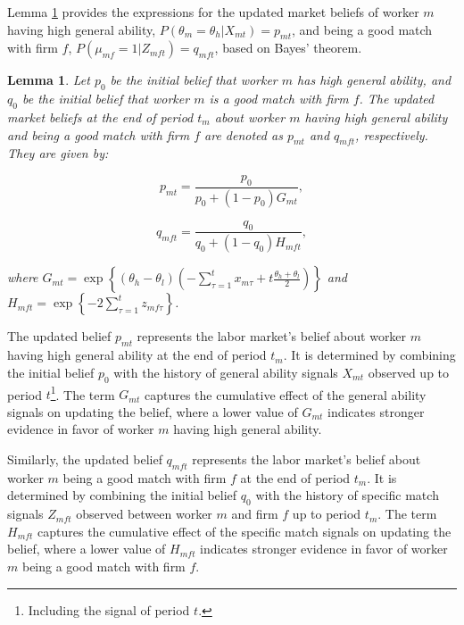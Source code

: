 \documentclass[12pt]{article}
\newtheorem{lemma}{Lemma}
\begin{document}
Lemma \ref{lemma:beliefs_NR} provides the expressions for the updated market beliefs of worker $m$ having high general ability, $P(\theta_m = \theta_h | X_{mt}) = p_{mt}$, and being a good match with firm $f$, $P(\mu_{mf} = 1 | Z_{mft}) = q_{mft}$, based on Bayes' theorem.

\begin{lemma}\label{lemma:beliefs_NR}
Let $p_0$ be the initial belief that worker $m$ has high general ability, and $q_0$ be the initial belief that worker $m$ is a good match with firm $f$. The updated market beliefs at the end of period $t_m$ about worker $m$ having high general ability and being a good match with firm $f$ are denoted as $p_{mt}$ and $q_{mft}$, respectively. They are given by:

\begin{equation}\label{eq:prob_NR}
p_{mt} = \frac{p_0}{p_0 + (1-p_0)G_{mt}},
\end{equation}

\begin{equation}\label{eq:qrob_NR}
q_{mft} = \frac{q_0}{q_0 + (1-q_0)H_{mft}},
\end{equation}

where $G_{mt} = \exp \left\lbrace \left(\theta_h - \theta_l\right)\left(-\sum_{\tau = 1}^{t} x_{m\tau} + t\frac{\theta_h + \theta_l}{2}\right)\right\rbrace$ and $H_{mft} = \exp \left\lbrace -2\sum_{\tau = 1}^{t} z_{mf\tau} \right\rbrace$.
\end{lemma}

The updated belief $p_{mt}$ represents the labor market's belief about worker $m$ having high general ability at the end of period $t_m$. It is determined by combining the initial belief $p_0$ with the history of general ability signals $X_{mt}$ observed up to period $t$\footnote{Including the signal of period $t$.}. The term $G_{mt}$ captures the cumulative effect of the general ability signals on updating the belief, where a lower value of $G_{mt}$ indicates stronger evidence in favor of worker $m$ having high general ability.

Similarly, the updated belief $q_{mft}$ represents the labor market's belief about worker $m$ being a good match with firm $f$ at the end of period $t_m$. It is determined by combining the initial belief $q_0$ with the history of specific match signals $Z_{mft}$ observed between worker $m$ and firm $f$ up to period $t_m$. The term $H_{mft}$ captures the cumulative effect of the specific match signals on updating the belief, where a lower value of $H_{mft}$ indicates stronger evidence in favor of worker $m$ being a good match with firm $f$. 
\end{document}
